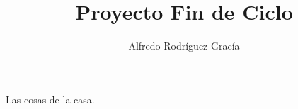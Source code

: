 \documentclass[12pt,a4paper,titlepage]{article}
\title{Proyecto Fin de Ciclo}
\author{Alfredo Rodríguez Gracía}
\begin{document}
    \maketitle

    Las cosas de la casa.
\end{document}
